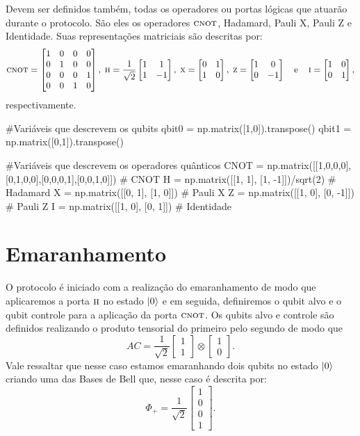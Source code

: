 Devem ser definidos também, todas os operadores ou portas lógicas que atuarão durante o protocolo. São eles os operadores \(\operatorname{\textsc{cnot}}\), Hadamard, Pauli X, Pauli Z e Identidade. Suas representações matriciais são descritas por:
\[ \operatorname{\textsc{cnot}} =
  \begin{bmatrix}
    1 & 0 & 0 & 0 \\
    0 & 1 & 0 & 0 \\
    0 & 0 & 0 & 1 \\
    0 & 0 & 1 & 0
  \end{bmatrix},\;
  \operatorname{\textsc{h}} = \frac{1}{\sqrt{2}} \begin{bmatrix} 1 & 1 \\ 1 & -1 \end{bmatrix},\;
  \operatorname{\textsc{x}} = \begin{bmatrix} 0 & 1 \\ 1 & 0 \end{bmatrix},\;
  \operatorname{\textsc{z}} = \begin{bmatrix} 1 & 0 \\ 0 & -1 \end{bmatrix} \quad \text{e} \quad
  \operatorname{\textsc{i}} = \begin{bmatrix} 1 & 0 \\ 0 & 1 \end{bmatrix},
\]
respectivamente.

\begin{pycode}
    #Variáveis que descrevem os qubits
    qbit0 = np.matrix([1,0]).transpose()
    qbit1 = np.matrix([0,1]).transpose()

    #Variáveis que descrevem os operadores quânticos
    CNOT = np.matrix([[1,0,0,0],[0,1,0,0],[0,0,0,1],[0,0,1,0]])  # CNOT
    H = np.matrix([[1, 1], [1, -1]])/sqrt(2)  # Hadamard
    X = np.matrix([[0, 1], [1, 0]])  # Pauli X
    Z = np.matrix([[1, 0], [0, -1]])  # Pauli Z
    I = np.matrix([[1, 0], [0, 1]])  # Identidade
\end{pycode}

\section{Emaranhamento}\label{emaranhamento}

O protocolo é iniciado com a realização do emaranhamento de modo que aplicaremos a porta \(\operatorname{\textsc{h}}\) no estado \(\ket{0}\) e em seguida, definiremos o qubit alvo e o qubit controle para a aplicação da porta \(\operatorname{\textsc{cnot}}\). Os qubits alvo e controle são definidos realizando o produto tensorial do primeiro pelo segundo de modo que
\[
  AC = \frac{1}{\sqrt{2}} \begin{bmatrix} 1 \\ 1 \end{bmatrix} \otimes \begin{bmatrix} 1 \\ 0 \end{bmatrix}.
\]
Vale ressaltar que nesse caso estamos emaranhando dois qubits no estado \(\ket{0}\) criando uma das Bases de Bell que, nesse caso é descrita por:
\[
  \Phi_+ = \frac{1}{\sqrt{2}} \begin{bmatrix} 1 \\ 0 \\ 0 \\ 1 \end{bmatrix}.
\]

